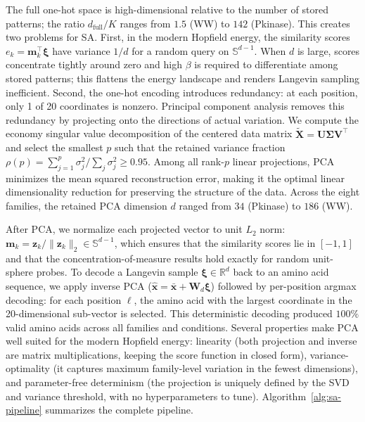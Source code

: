 The full one-hot space is high-dimensional relative to the number of stored patterns; the ratio $d_{\mathrm{full}}/K$ ranges from $1.5$ (WW) to $142$ (Pkinase). This creates two problems for SA. First, in the modern Hopfield energy, the similarity scores $e_k = \mathbf{m}_k^\top\boldsymbol{\xi}$ have variance $1/d$ for a random query on $\mathbb{S}^{d-1}$. When $d$ is large, scores concentrate tightly around zero and high $\beta$ is required to differentiate among stored patterns; this flattens the energy landscape and renders Langevin sampling inefficient. Second, the one-hot encoding introduces redundancy: at each position, only 1 of 20 coordinates is nonzero. Principal component analysis removes this redundancy by projecting onto the directions of actual variation. We compute the economy singular value decomposition of the centered data matrix $\tilde{\mathbf{X}} = \mathbf{U}\boldsymbol{\Sigma}\mathbf{V}^\top$ and select the smallest $p$ such that the retained variance fraction $\rho(p) = \sum_{j=1}^p \sigma_j^2 / \sum_j \sigma_j^2 \geq 0.95$. Among all rank-$p$ linear projections, PCA minimizes the mean squared reconstruction error, making it the optimal linear dimensionality reduction for preserving the structure of the data. Across the eight families, the retained PCA dimension $d$ ranged from $34$ (Pkinase) to $186$ (WW).

After PCA, we normalize each projected vector to unit $L_2$ norm: $\mathbf{m}_k = \mathbf{z}_k / \|\mathbf{z}_k\|_2 \in \mathbb{S}^{d-1}$, which ensures that the similarity scores lie in $[-1, 1]$ and that the concentration-of-measure results hold exactly for random unit-sphere probes. To decode a Langevin sample $\boldsymbol{\xi} \in \mathbb{R}^d$ back to an amino acid sequence, we apply inverse PCA ($\hat{\mathbf{x}} = \bar{\mathbf{x}} + \mathbf{W}_d\boldsymbol{\xi}$) followed by per-position argmax decoding: for each position $\ell$, the amino acid with the largest coordinate in the 20-dimensional sub-vector is selected. This deterministic decoding produced $100\%$ valid amino acids across all families and conditions. Several properties make PCA well suited for the modern Hopfield energy: linearity (both projection and inverse are matrix multiplications, keeping the score function in closed form), variance-optimality (it captures maximum family-level variation in the fewest dimensions), and parameter-free determinism (the projection is uniquely defined by the SVD and variance threshold, with no hyperparameters to tune). Algorithm~\ref{alg:sa-pipeline} summarizes the complete pipeline.

